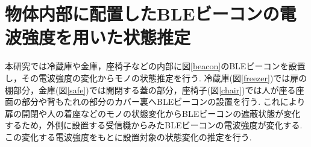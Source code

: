 \documentclass[Japanese]{dicomopapers}
\begin{document}





\section{物体内部に配置したBLEビーコンの電波強度を用いた状態推定}
本研究では冷蔵庫や金庫，座椅子などの内部に図\ref{beacon}のBLEビーコンを設置し，その電波強度の変化からモノの状態推定を行う.
冷蔵庫(図\ref{freezer})では扉の棚部分，金庫(図\ref{safe})では開閉する蓋の部分，座椅子(図\ref{chair})では人が座る座面の部分や背もたれの部分のカバー裏へBLEビーコンの設置を行う.
これにより扉の開閉や人の着座などのモノの状態変化からBLEビーコンの遮蔽状態が変化するため，外側に設置する受信機からみたBLEビーコンの電波強度が変化する.
この変化する電波強度をもとに設置対象の状態変化の推定を行う.
\end{document}
